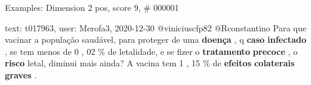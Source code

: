 \begin{frame}{Examples: Dimension 2 pos, score 9, \# 000001}
\footnotesize
\begin{exampleblock}{text: t017963, user: Merofa3, 2020-12-30}
@viniciuscfp82 @Rconstantino Para que vacinar a população saudável, para 
proteger de uma \textbf{doença} , q \textbf{caso} \textbf{infectado} , se tem 
menos de 0 , 02 \% de letalidade, e se fizer o \textbf{tratamento} 
\textbf{precoce} , o \textbf{risco} letal, diminui mais ainda? A vacina tem 1 , 
15 \% de \textbf{efeitos} \textbf{colaterais} \textbf{graves} . 
\end{exampleblock}
\end{frame}
